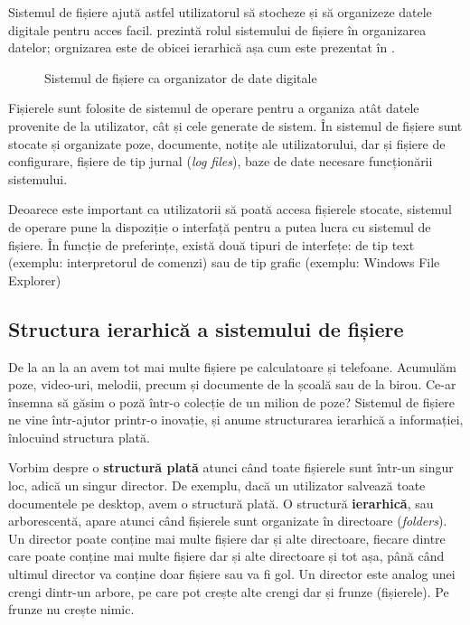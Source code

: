 Sistemul de fișiere ajută astfel utilizatorul să stocheze și să organizeze datele digitale pentru acces facil.  prezintă rolul sistemului de fișiere în organizarea datelor; orgnizarea este de obicei ierarhică așa cum este prezentat în .

\begin{figure}[htbp]
	\centering
	\def\svgwidth{\columnwidth}
	
	\caption{Sistemul de fișiere ca organizator de date digitale}
	\label{fig:def-fs}
\end{figure}

Fișierele sunt folosite de sistemul de operare pentru a organiza atât
datele provenite de la utilizator, cât și cele generate de sistem. În sistemul de fișiere sunt stocate și organizate poze, documente, notițe ale utilizatorului, dar și fișiere de configurare, fișiere de tip jurnal (\textit{log files}), baze de date necesare funcționării sistemului.

Deoarece este important ca utilizatorii să poată accesa fișierele stocate,
sistemul de operare pune la dispoziție o interfață pentru a putea lucra cu
sistemul de fișiere. În funcție de preferințe, există două tipuri de interfețe:
de tip text (exemplu: interpretorul de comenzi) sau de tip grafic (exemplu:
Windows File Explorer)

\subsection{Structura ierarhică a sistemului de fișiere}
\label{sec:file-system-baza-struct}

De la an la an avem tot mai multe fișiere pe calculatoare și telefoane. Acumulăm
poze, video-uri, melodii, precum și documente de la școală sau de la birou.
Ce-ar însemna să găsim o poză într-o colecție de un milion de poze? Sistemul de
fișiere ne vine într-ajutor printr-o inovație, și anume structurarea ierarhică a
informației, înlocuind structura plată.

Vorbim despre o \textbf{structură plată} atunci când toate fișierele sunt
într-un singur loc, adică un singur director. De exemplu, dacă un utilizator
salvează toate documentele pe desktop, avem o structură plată. O structură
\textbf{ierarhică}, sau arborescentă, apare atunci când fișierele sunt
organizate în directoare (\textit{folders}). Un director poate conține mai
multe fișiere dar și alte directoare, fiecare dintre care poate conține mai
multe fișiere dar și alte directoare și tot așa, până când ultimul director va
conține doar fișiere sau va fi gol. Un director este analog unei crengi dintr-un
arbore, pe care pot crește alte crengi dar și frunze (fișierele). Pe frunze nu
crește nimic.

